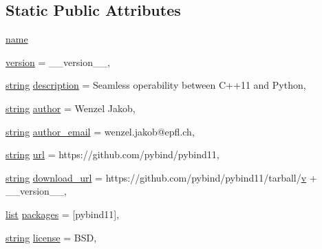 \subsection*{Static Public Attributes}
\begin{DoxyCompactItemize}
\item 
\mbox{\hyperlink{classsetup_1_1_install_headers_a5ede539f8bc93cb726f2bdd01d1b1321}{name}}
\item 
\mbox{\hyperlink{classsetup_1_1_install_headers_a413b3192ce921d5bfc74a1238faf65e6}{version}} = \+\_\+\+\_\+version\+\_\+\+\_\+,
\item 
\mbox{\hyperlink{asdl_8h_ae84541b4f3d8e1ea24ec0f466a8c568b}{string}} \mbox{\hyperlink{classsetup_1_1_install_headers_aa733b14631ba49303b6b564d9938905d}{description}} = \textquotesingle{}Seamless operability between C++11 and Python\textquotesingle{},
\item 
\mbox{\hyperlink{asdl_8h_ae84541b4f3d8e1ea24ec0f466a8c568b}{string}} \mbox{\hyperlink{classsetup_1_1_install_headers_aadf306ab175ac177165c4ee49273c664}{author}} = \textquotesingle{}Wenzel Jakob\textquotesingle{},
\item 
\mbox{\hyperlink{asdl_8h_ae84541b4f3d8e1ea24ec0f466a8c568b}{string}} \mbox{\hyperlink{classsetup_1_1_install_headers_a516a166c0e25757e2c837f48ffca0327}{author\+\_\+email}} = \textquotesingle{}wenzel.\+jakob@epfl.\+ch\textquotesingle{},
\item 
\mbox{\hyperlink{asdl_8h_ae84541b4f3d8e1ea24ec0f466a8c568b}{string}} \mbox{\hyperlink{classsetup_1_1_install_headers_a754ae3bec90ac6ced32d4ae4705a868c}{url}} = \textquotesingle{}https\+://github.\+com/pybind/pybind11\textquotesingle{},
\item 
\mbox{\hyperlink{asdl_8h_ae84541b4f3d8e1ea24ec0f466a8c568b}{string}} \mbox{\hyperlink{classsetup_1_1_install_headers_a7a9eef5bfa21f2f5b6c5f28541ea65fc}{download\+\_\+url}} = \textquotesingle{}https\+://github.\+com/pybind/pybind11/tarball/\mbox{\hyperlink{_s_d_l__opengl_8h_a10a82eabcb59d2fcd74acee063775f90}{v}}\textquotesingle{} + \+\_\+\+\_\+version\+\_\+\+\_\+,
\item 
\mbox{\hyperlink{classlist}{list}} \mbox{\hyperlink{classsetup_1_1_install_headers_a4230d6d94fdf5948f36db48c501bd996}{packages}} = \mbox{[}\textquotesingle{}pybind11\textquotesingle{}\mbox{]},
\item 
\mbox{\hyperlink{asdl_8h_ae84541b4f3d8e1ea24ec0f466a8c568b}{string}} \mbox{\hyperlink{classsetup_1_1_install_headers_aa7ac745f9feae2969e283d1ab887c339}{license}} = \textquotesingle{}B\+SD\textquotesingle{},

\end{DoxyCompactItemize}
